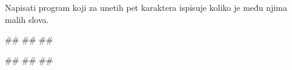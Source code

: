\begin{Exercise}[label=p1.2_07] 
Napisati program koji za unetih pet karaktera ispisuje koliko je među njima malih slova.

\begin{miditest}
\begin{upotreba}{1}
#\naslovInt#
##
##
\end{upotreba}
\end{miditest}
\begin{miditest}
\begin{upotreba}{2}
#\naslovInt#
##
##
\end{upotreba}
\end{miditest}

\end{Exercise}
\begin{Answer}[ref=p1.2_07]
\end{Answer}


